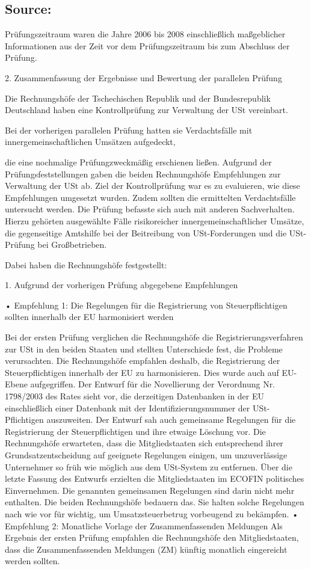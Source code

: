 \documentclass[10pt]{article}
\begin{document}
\subsection*{Source:}

Prüfungszeitraum waren die Jahre 2006 bis 2008 einschließlich maßgeblicher Informationen aus der Zeit vor dem Prüfungszeitraum bis zum Abschluss der Prüfung.


2. Zusammenfassung der Ergebnisse und Bewertung der parallelen Prüfung 

Die Rechnungshöfe der Tschechischen Republik und der Bundesrepublik Deutschland haben eine Kontrollprüfung zur Verwaltung der USt vereinbart.


Bei der vorherigen parallelen Prüfung hatten sie Verdachtsfälle mit innergemeinschaftlichen Umsätzen aufgedeckt, 

die eine nochmalige Prüfungzweckmäßig erschienen ließen.
Aufgrund der Prüfungsfeststellungen gaben die beiden Rechnungshöfe Empfehlungen zur Verwaltung der USt ab.
Ziel der Kontrollprüfung war es zu evaluieren, wie diese Empfehlungen umgesetzt wurden. Zudem sollten die ermittelten Verdachtsfälle untersucht werden.
Die Prüfung befasste sich auch mit anderen Sachverhalten. Hierzu gehörten ausgewählte Fälle risikoreicher innergemeinschaftlicher Umsätze, die gegenseitige Amtshilfe bei der Beitreibung von USt-Forderungen und die USt-Prüfung bei Großbetrieben.


Dabei haben die Rechnungshöfe festgestellt: 



1. Aufgrund der vorherigen Prüfung abgegebene Empfehlungen 



• Empfehlung 1: Die Regelungen für die Registrierung von Steuerpflichtigen sollten innerhalb der EU harmonisiert werden 

Bei der ersten Prüfung verglichen die Rechnungshöfe die Registrierungsverfahren zur USt in den beiden Staaten und stellten Unterschiede fest, die Probleme verursachten.
Die Rechnungshöfe empfahlen deshalb, die Registrierung der Steuerpflichtigen innerhalb der EU zu harmonisieren.
Dies wurde auch auf EU-Ebene aufgegriffen.
Der Entwurf für die Novellierung der Verordnung Nr. 1798/2003 des Rates sieht vor, die derzeitigen Datenbanken in der EU einschließlich einer Datenbank mit der Identifizierungsnummer der USt-Pflichtigen auszuweiten.
Der Entwurf sah auch gemeinsame Regelungen für die Registrierung der Steuerpflichtigen und ihre etwaige Löschung vor.
Die Rechnungshöfe erwarteten, dass die Mitgliedstaaten sich entsprechend ihrer Grundsatzentscheidung auf geeignete Regelungen einigen, um unzuverlässige Unternehmer so früh wie möglich aus dem USt-System zu entfernen.
Über die letzte Fassung des Entwurfs erzielten die Mitgliedstaaten im ECOFIN politisches Einvernehmen.
Die genannten gemeinsamen Regelungen sind darin nicht mehr enthalten. Die beiden Rechnungshöfe bedauern das.
Sie halten solche Regelungen nach wie vor für wichtig, um Umsatzsteuerbetrug vorbeugend zu bekämpfen.
• Empfehlung 2: Monatliche Vorlage der Zusammenfassenden Meldungen Als Ergebnis der ersten Prüfung empfahlen die Rechnungshöfe den Mitgliedstaaten, dass die Zusammenfassenden Meldungen (ZM) künftig monatlich eingereicht werden sollten.
\end{document}
